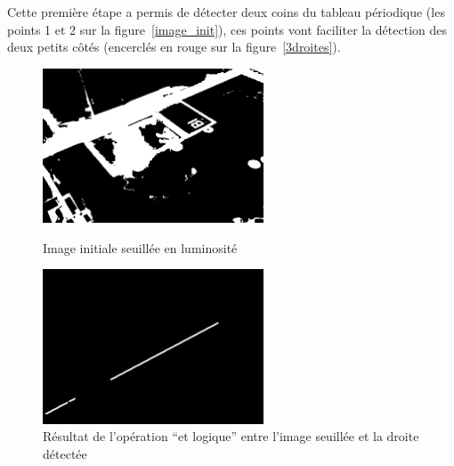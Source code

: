 \documentclass{article}
\begin{document}
Cette première étape a permis de détecter deux coins du tableau périodique (les points 1 et 2 sur la figure~\ref{image_init}), ces points vont
faciliter la détection des deux petits côtés (encerclés en rouge sur la figure~\ref{3droites}).
\begin{figure}[!h] \hfill
   \begin{minipage}[t]{.4\linewidth}
      \begin{center}
      \includegraphics[height=130pt]{image_seuillee_en_luminosite.png}  
      \end{center}
      \caption{Image initiale seuillée en luminosité}
      \label{seuillee}
   \end{minipage} \hfill
   \begin{minipage}[t]{.4\linewidth}
      \begin{center}
      \includegraphics[height=130pt]{image_droite_1.png}  
      \end{center}
      \caption{Résultat de l'opération ``et logique'' entre l'image seuillée et la droite détectée}
      \label{droite1}
   \end{minipage} \hfill \hfill
\end{figure}
\end{document}
